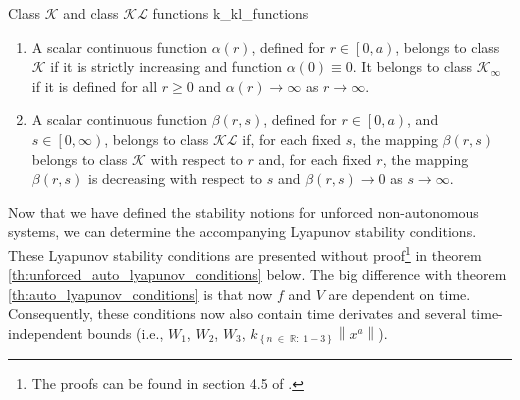 \begin{definition}[list text=Class $\mathcal{K}$ and class $\mathcal{KL}$ functions]{Class $\mathcal{K}$ and class $\mathcal{KL}$ functions \cite{khalilNonlinearControl2015}}{k_kl_functions}
  \begin{enumerate}
    \item A scalar continuous function $\alpha \left( r \right)$, defined for $r \in\left[0, a \right)$, belongs to class $\mathcal{K}$ if it is strictly increasing and function $\alpha \left( 0 \right)\equiv 0$. It belongs to class $\mathcal{K}_\infty$ if it is defined for all $r \geq 0$ and $\alpha \left( r \right)\rightarrow\infty$ as $r \rightarrow\infty$.
    \item A scalar continuous function $\beta \left( r, s \right)$, defined for $r \in\left[0, a \right)$, and $s \in\left[0, \infty\right)$, belongs to class $\mathcal{KL}$ if, for each fixed $s$, the mapping $\beta \left( r, s \right)$ belongs to class $\mathcal{K}$ with respect to $r$ and, for each fixed $r$, the mapping $\beta \left( r, s \right)$ is decreasing with respect to $s$ and $\beta \left( r, s \right)\rightarrow 0$ as $s \rightarrow\infty$.
  \end{enumerate}
\end{definition}

Now that we have defined the stability notions for unforced non-autonomous systems, we can determine the accompanying Lyapunov stability conditions. These Lyapunov stability conditions are presented without proof\footnote{The proofs can be found in section 4.5 of \cite{khalilNonlinearSystems2002}.} in theorem \ref{th:unforced_auto_lyapunov_conditions} below. The big difference with theorem \ref{th:auto_lyapunov_conditions} is that now $f$ and $V$ are dependent on time. Consequently, these conditions now also contain time derivates and several time-independent bounds (i.e., $W_1$, $W_2$, $W_3$, $k_{\left\{n \; \in \; \mathbb{R}: \; 1 - 3 \right\}} \left\|x^a\right\|$).

